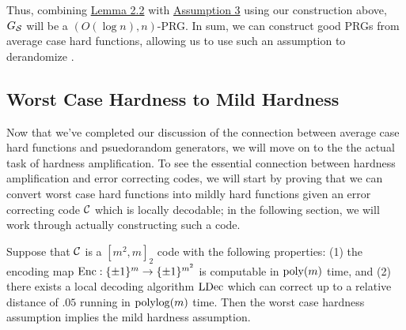 \documentclass[11pt]{article}
\begin{document}
Thus, combining \hyperref[l-2-2]{Lemma 2.2} with \hyperref[a-3]{Assumption 3} using our construction above, $G_{\mathcal{S}}$ will be a $(O(\log n), n)$-PRG. In sum, we can construct good PRGs from average case hard functions, allowing us to use such an assumption to derandomize \BPP{}.

\subsection{Worst Case Hardness to Mild Hardness}

Now that we've completed our discussion of the connection between average case hard functions and psuedorandom generators, we will move on to the the actual task of hardness amplification. To see the essential connection between hardness amplification and error correcting codes, we will start by proving that we can convert worst case hard functions into mildly hard functions given an error correcting code $\mathcal{C}$ which is locally decodable; in the following section, we will work through actually constructing such a code.

\begin{theorem}{2.6}\label{t-2-6}
    Suppose that $\mathcal{C}$ is a $[m^2, m]_2$ code with the following properties: (1) the encoding map $\mathrm{Enc} : \{\pm 1\}^m \rightarrow \{\pm 1\}^{m^2}$ is computable in $\mathrm{poly}(m)$ time, and (2) there exists a local decoding algorithm ${\textup{LDec}}$ which can correct up to a relative distance of $.05$ running in $\mathrm{polylog}(m)$ time. Then the worst case hardness assumption implies the mild hardness assumption.
\end{theorem}
\end{document}
